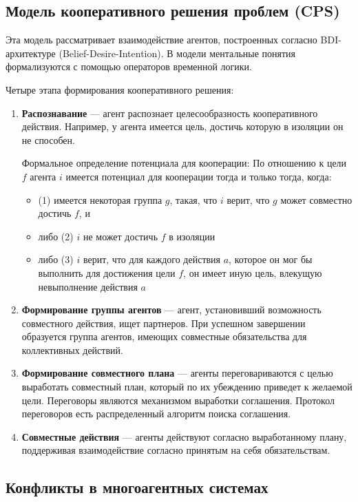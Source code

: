 \subsection{Модель кооперативного решения проблем (CPS)}

Эта модель рассматривает взаимодействие агентов, построенных согласно BDI-архитектуре (Belief-Desire-Intention). В модели ментальные понятия формализуются с помощью операторов временной логики.

Четыре этапа формирования кооперативного решения:

\begin{enumerate}
  \item \textbf{Распознавание} — агент распознает целесообразность кооперативного действия. Например, у агента имеется цель, достичь которую в изоляции он не способен.
  
  Формальное определение потенциала для кооперации: По отношению к цели $f$ агента $i$ имеется потенциал для кооперации тогда и только тогда, когда:
  
  \begin{itemize}
    \item (1) имеется некоторая группа $g$, такая, что $i$ верит, что $g$ может совместно достичь $f$, и
    \item либо (2) $i$ не может достичь $f$ в изоляции
    \item либо (3) $i$ верит, что для каждого действия $a$, которое он мог бы выполнить для достижения цели $f$, он имеет иную цель, влекущую невыполнение действия $a$
  \end{itemize}
  
  \item \textbf{Формирование группы агентов} — агент, установивший возможность совместного действия, ищет партнеров. При успешном завершении образуется группа агентов, имеющих совместные обязательства для коллективных действий.
  \item \textbf{Формирование совместного плана} — агенты переговариваются с целью выработать совместный план, который по их убеждению приведет к желаемой цели. Переговоры являются механизмом выработки соглашения. Протокол переговоров есть распределенный алгоритм поиска соглашения.
  \item \textbf{Совместные действия} — агенты действуют согласно выработанному плану, поддерживая взаимодействие согласно принятым на себя обязательствам.
\end{enumerate}

\subsection{Конфликты в многоагентных системах}

